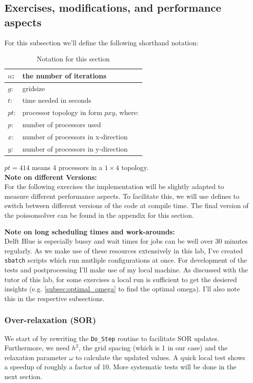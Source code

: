 \subsection{Exercises, modifications, and performance aspects}
For this subsection we'll define the following shorthand notation: \\
\begin{table}[h!]
    \centering
    \caption{Notation for this section}
    \begin{tabular}{|l|l|}
        \hline
        $n$:  &the number of iterations\\\hline
        $g$:  &gridsize\\\hline
        $t$:  &time needed in seconds\\\hline
        $pt$: & processor topology in form $pxy$, where:\\
        $p$:  &number of processors used\\
        $x$:  &number of processors in x-direction\\
        $y$:  &number of processors in y-direction\\\hline
       \end{tabular}
\end{table}
$pt = 414$ means 4 processors in a $1\times 4$ topology. \\

\textbf{Note on different Versions:}\\
For the following exercises the implementation will be slightly adapted to measure different performance aspects. To facilitate this, we will use defines to switch between different versions of the code at compile time. The final version of the poissonsolver can be found in the appendix for this section.

\textbf{Note on long scheduling times and work-arounds:}\\
Delft Blue is especially bussy and wait times for jobs can be well over 30 minutes regularly. As we make use of these resources extensively in this lab, I've created \texttt{sbatch} scripts which run mutliple configurations at once. For development of the tests and postprocessing I'll make use of my local machine. As discussed with the tutor of this lab, for some exercises a local run is sufficient to get the desiered insights (e.g. \autoref{subsec:optimal_omega} to find the optimal omega). I'll also note this in the respective subsections.
\subsubsection{Over-relaxation (SOR)}
We start of by rewriting the \texttt{Do\_Step} routine to facilitate SOR updates. Furthermore, we need $h^2$, the grid spacing (which is 1 in our case) and the relaxation parameter $\omega$ to calculate the updated values. A quick local test shows a speedup of roughly a factor of 10. More systematic tests will be done in the next section.
